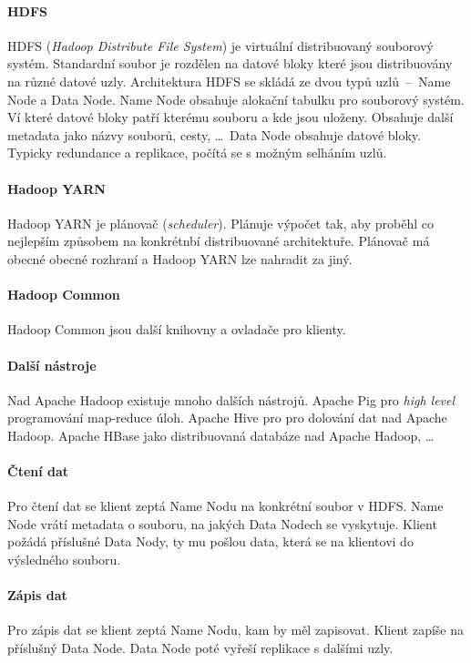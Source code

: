 \paragraph*{HDFS} HDFS (\textit{Hadoop Distribute File System}) je virtuální distribuovaný souborový systém. Standardní soubor je rozdělen na datové bloky které jsou distribuovány na různé datové uzly. Architektura HDFS se skládá ze dvou typů uzlů~--~Name Node a Data Node. Name Node obsahuje alokační tabulku pro souborový systém. Ví které datové bloky patří kterému souboru a kde jsou uloženy. Obsahuje další metadata jako názvy souborů, cesty, \dots \, Data Node obsahuje datové bloky. Typicky redundance a replikace, počítá se s možným selháním uzlů.

\paragraph*{Hadoop YARN} Hadoop YARN je plánovač (\textit{scheduler}). Plánuje výpočet tak, aby proběhl co nejlepším způsobem na konkrétnbí distribuované architektuře. Plánovač má obecné obecné rozhraní a Hadoop YARN lze nahradit za jiný.

\paragraph*{Hadoop Common} Hadoop Common jsou další knihovny a ovladače pro klienty.

\paragraph*{Další nástroje} Nad Apache Hadoop existuje mnoho dalších nástrojů. Apache Pig pro \textit{high level} programování map-reduce úloh. Apache Hive pro pro dolování dat nad Apache Hadoop. Apache HBase jako distribuovaná databáze nad Apache Hadoop, \dots

\paragraph*{Čtení dat} Pro čtení dat se klient zeptá Name Nodu na konkrétní soubor v HDFS. Name Node vrátí metadata o souboru, na jakých Data Nodech se vyskytuje. Klient požádá příslušné Data Nody, ty mu pošlou data, která se na klientovi  do výsledného souboru.

\paragraph*{Zápis dat} Pro zápis dat se klient zeptá Name Nodu, kam by měl zapisovat. Klient zapíše na příslušný Data Node. Data Node poté vyřeší replikace s dalšími uzly.

